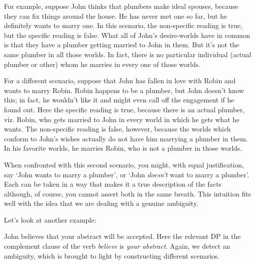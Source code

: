 For example, suppose John thinks that plumbers make ideal spouses, because they
can fix things around the house. He has never met one so far, but he definitely
wants to marry one. In this scenario, the non-specific reading is true, but the
specific reading is false. What all of John's desire-worlds have in common is
that they have a plumber getting married to John in them. But it's not the same
plumber in all those worlds. In fact, there is no particular individual (actual
plumber or other) whom he marries in every one of those worlds.

For a different scenario, suppose that John has fallen in love with Robin and
wants to marry Robin. Robin happens to be a plumber, but John doesn't know this;
in fact, he wouldn't like it and might even call off the engagement if he found
out. Here the specific reading is true, because there is an actual plumber, viz.
Robin, who gets married to John in every world in which he gets what he wants.
The non-specific reading is false, however, because the worlds which conform to
John's wishes actually do not have him marrying a plumber in them. In his
favorite worlds, he marries Robin, who is not a plumber in those worlds.

When confronted with this second scenario, you might, with equal justification,
say `John wants to marry a plumber', or `John \emph{doesn't} want to marry a
plumber'. Each can be taken in a way that makes it a true description of the
facts \dash although, of course, you cannot assert both in the same
breath. This intuition
fits well with the idea that we are dealing with a genuine ambiguity.

Let's look at another example:

\ex John believes that your abstract will be accepted. \xe
%
Here the relevant DP in the complement clause of the verb \emph{believe} is
\emph{your abstract}. Again, we detect an ambiguity, which is brought to light
by constructing different scenarios.

